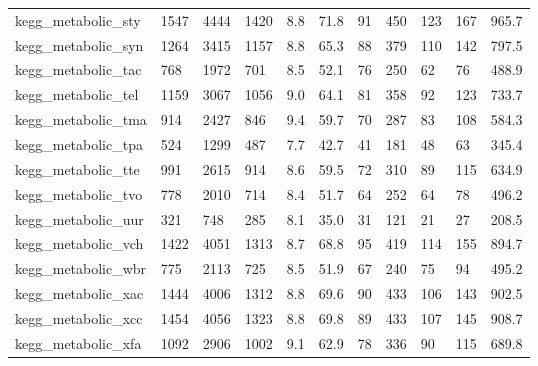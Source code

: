 \begin{longtable}{lllllllllll}
 kegg\_metabolic\_sty                                 & 1547       & 4444      & 1420  & 8.8    & 71.8   & 91    & 450    & 123    & 167    & 965.7   \\
 kegg\_metabolic\_syn                                 & 1264       & 3415      & 1157  & 8.8    & 65.3   & 88    & 379    & 110    & 142    & 797.5   \\
 kegg\_metabolic\_tac                                 & 768        & 1972      & 701   & 8.5    & 52.1   & 76    & 250    & 62     & 76     & 488.9   \\
 kegg\_metabolic\_tel                                 & 1159       & 3067      & 1056  & 9.0    & 64.1   & 81    & 358    & 92     & 123    & 733.7   \\
 kegg\_metabolic\_tma                                 & 914        & 2427      & 846   & 9.4    & 59.7   & 70    & 287    & 83     & 108    & 584.3   \\
 kegg\_metabolic\_tpa                                 & 524        & 1299      & 487   & 7.7    & 42.7   & 41    & 181    & 48     & 63     & 345.4   \\
 kegg\_metabolic\_tte                                 & 991        & 2615      & 914   & 8.6    & 59.5   & 72    & 310    & 89     & 115    & 634.9   \\
 kegg\_metabolic\_tvo                                 & 778        & 2010      & 714   & 8.4    & 51.7   & 64    & 252    & 64     & 78     & 496.2   \\
 kegg\_metabolic\_uur                                 & 321        & 748       & 285   & 8.1    & 35.0   & 31    & 121    & 21     & 27     & 208.5   \\
 kegg\_metabolic\_vch                                 & 1422       & 4051      & 1313  & 8.7    & 68.8   & 95    & 419    & 114    & 155    & 894.7   \\
 kegg\_metabolic\_wbr                                 & 775        & 2113      & 725   & 8.5    & 51.9   & 67    & 240    & 75     & 94     & 495.2   \\
 kegg\_metabolic\_xac                                 & 1444       & 4006      & 1312  & 8.8    & 69.6   & 90    & 433    & 106    & 143    & 902.5   \\
 kegg\_metabolic\_xcc                                 & 1454       & 4056      & 1323  & 8.8    & 69.8   & 89    & 433    & 107    & 145    & 908.7   \\
 kegg\_metabolic\_xfa                                 & 1092       & 2906      & 1002  & 9.1    & 62.9   & 78    & 336    & 90     & 115    & 689.8   \\

\end{longtable}

